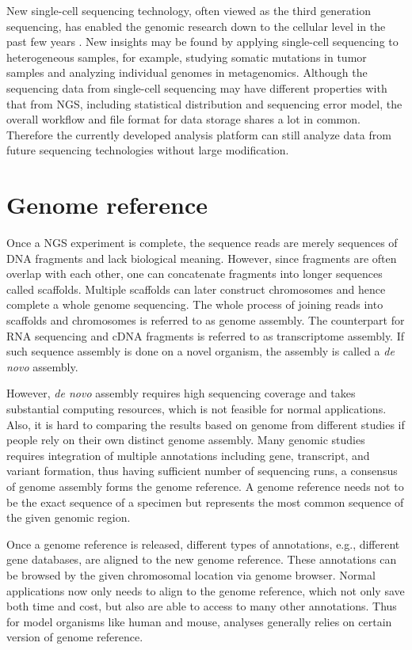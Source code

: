New single-cell sequencing technology, often viewed as the third generation
sequencing, has enabled the genomic research down to the cellular level in the
past few years \cite{gawad2016:singlecell}. New insights may be found by
applying single-cell sequencing to heterogeneous samples, for example, studying
somatic mutations in tumor samples and analyzing individual genomes in
metagenomics. Although the sequencing data from single-cell sequencing may have
different properties with that from NGS, including statistical distribution and
sequencing error model, the overall workflow and file format for data storage
shares a lot in common. Therefore the currently developed analysis platform can
still analyze data from future sequencing technologies without large
modification.



\section{Genome reference}
\label{s:genome-ref}

Once a NGS experiment is complete, the sequence reads are merely sequences of
DNA fragments and lack biological meaning. However, since fragments are often
overlap with each other, one can concatenate fragments into longer sequences
called scaffolds. Multiple scaffolds can later construct chromosomes and hence
complete a whole genome sequencing. The whole process of joining reads into
scaffolds and chromosomes is referred to as genome assembly. The counterpart
for RNA sequencing and cDNA fragments is referred to as transcriptome assembly.
If such sequence assembly is done on a novel organism, the assembly is called
a \textit{de novo} assembly.

However, \textit{de novo} assembly requires high sequencing coverage and takes
substantial computing resources, which is not feasible for normal applications.
Also, it is hard to comparing the results based on genome from different
studies if people rely on their own distinct genome assembly. Many genomic
studies requires integration of multiple annotations including gene, transcript,
and variant formation, thus having sufficient number of sequencing runs, a
consensus of genome assembly forms the genome reference. A genome reference
needs not to be the exact sequence of a specimen but represents the most common
sequence of the given genomic region.

Once a genome reference is released, different types of annotations, e.g.,
different gene databases, are aligned to the new genome reference. These
annotations can be browsed by the given chromosomal location via genome
browser. Normal applications now only needs to align to the genome reference,
which not only save both time and cost, but also are able to access to many
other annotations. Thus for model organisms like human and mouse, analyses
generally relies on certain version of genome reference.

